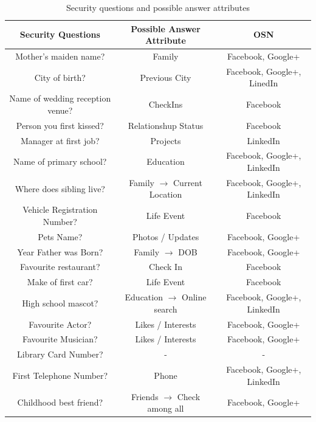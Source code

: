 \documentclass[10pt,conference]{IEEEtran}
\begin{document}
	\begin{table}[t]
	\normalsize
	\begin{center}
 		\begin{tabular}{|| c | c | c ||} 
 		\hline
 		Security Questions & Possible Answer Attribute & OSN \\ 
		\hline\hline
		Mother's maiden name? & Family & Facebook, Google+ \\
		\hline
		City of birth? & Previous City & Facebook, Google+, LinedIn \\
		\hline
		Name of wedding reception venue? & CheckIns & Facebook \\
		\hline
		Person you first kissed? & Relationshup Status & Facebook  \\
		\hline
		Manager at first job? & Projects & LinkedIn \\
		\hline
		Name of primary school? & Education & Facebook, Google+, LinkedIn \\
		\hline
		Where does sibling live? & Family $ \rightarrow$ Current Location & Facebook, Google+, LinkedIn \\
		\hline
		Vehicle Registration Number? & Life Event & Facebook \\
		\hline
		Pets Name? & Photos / Updates & Facebook, Google+ \\
		\hline
		Year Father was Born? & Family $ \rightarrow$ DOB & Facebook, Google+ \\
		\hline
		Favourite restaurant? & Check In & Facebook \\
		\hline
		Make of first car? & Life Event & Facebook \\
		\hline
		High school mascot? & Education $ \rightarrow$ Online search & Facebook, Google+, LinkedIn \\
		\hline
		Favourite Actor? & Likes / Interests & Facebook, Google+ \\
		\hline
		Favourite Musician? & Likes / Interests & Facebook, Google+ \\
		\hline
		Library Card Number? & - & - \\
		\hline
		First Telephone Number? & Phone & Facebook, Google+, LinkedIn \\
		\hline
		Childhood best friend? & Friends $ \rightarrow $ Check among all & Facebook, Google+ \\
		\hline
\end{tabular}
\caption{Security questions and possible answer attributes}
\end{center} 
\end{table}
\end{document}
